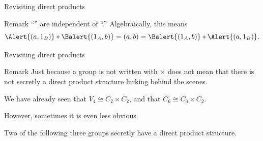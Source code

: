 \documentclass[8pt, handout]{beamer}
\newcommand{\Pause}{}
\begin{document}
\begin{frame}{Revisiting direct products}
  \vspace{-2mm}\Pause
  
  \begin{exampleblock}{Remark}
    ``'' are independent of ``.''
    Algebraically, this means
    \[
    \Alert{(a,1_B)}*\Balert{(1_A,b)}\Pause=(a,b)\Pause
    =\Balert{(1_A,b)}*\Alert{(a,1_B)}.
    \] \vspace{-5mm}
  \end{exampleblock}

\end{frame}


\begin{frame}{Revisiting direct products} \smallskip
  
  \begin{alertblock}{Remark}
    Just because a group is not written with $\times$ does not mean that
    there is not secretly a direct product structure lurking behind the
    scenes. 
  \end{alertblock}

  \medskip\Pause
  
  We have already seen that $V_4\cong C_2\times C_2$, and that
  $C_6\cong C_3\times C_2$. \medskip\Pause

  However, sometimes it is even less obvious. \medskip\Pause

  Two of the following three groups secretly have a
  direct product structure. \Pause 
  

\end{frame}
\end{document}
